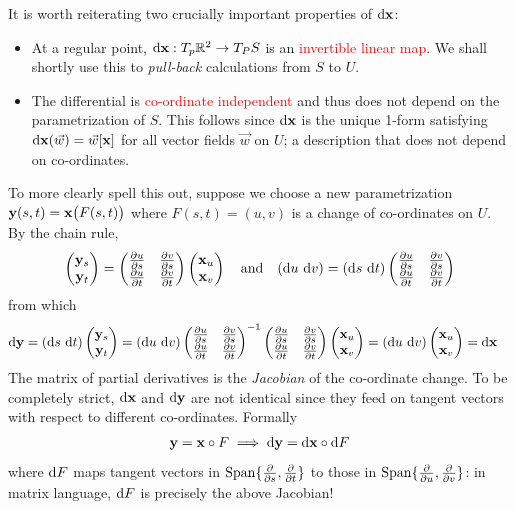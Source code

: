 It is worth reiterating two crucially important properties of $\dvx$:
\begin{itemize}
  \item At a regular point, $\dvx:T_p\R^2\to T_PS$ is an \textcolor{red}{invertible linear map}. We shall shortly use this to \emph{pull-back} calculations from $S$ to $U$.
  \item The differential is \textcolor{red}{co-ordinate independent} and thus does not depend on the parametrization of $S$. This follows since $\dvx$ is the unique 1-form satisfying $\dvx(\vec w)=\vec w[\vx]$ for all vector fields $\vec w$ on $U$; a description that does not depend on co-ordinates.
\end{itemize}


\begin{aside}\label{aside:coc}
	\quad To more clearly spell this out, suppose we choose a new parametrization $\vy(s,t)=\vx\bigl(F(s,t)\bigr)$ where $F(s,t)=(u,v)$ is a change of co-ordinates on $U$. By the chain rule,
	\[
		\twovec{\vy_s}{\vy_t}=
		\begin{pmatrix}
			\partials[u]{s}&\partials[v]{s}\\
			\partials[u]{t}&\partials[v]{t}
		\end{pmatrix}
		\twovec{\vx_u}{\vx_v} \quad\text{and}\quad
		(\du\ \dv)=(\ds\ \dt)
		\begin{pmatrix}
			\partials[u]{s}&\partials[v]{s}\\
			\partials[u]{t}&\partials[v]{t}
		\end{pmatrix}
	\]
	from which
	\begin{align*}
		\D\vy&=(\ds\ \dt)\twovec{\vy_s}{\vy_t} =(\du\ \dv)
		\begin{pmatrix}
			\partials[u]{s}&\partials[v]{s}\\
			\partials[u]{t}&\partials[v]{t}
		\end{pmatrix}^{-1}
		\begin{pmatrix}
			\partials[u]{s}&\partials[v]{s}\\
			\partials[u]{t}&\partials[v]{t}
		\end{pmatrix}
		\twovec{\vx_u}{\vx_v} =(\du\ \dv)\twovec{\vx_u}{\vx_v}=\dvx
	\end{align*}
	The matrix of partial derivatives is the \emph{Jacobian} of the co-ordinate change.
	\smallbreak
	To be completely strict, $\dvx$ and $\D\vy$ are not identical since they feed on tangent vectors with respect to different co-ordinates. Formally
	\[
		\vy=\vx\circ F\implies\D\vy=\dvx\circ\D F
	\]
	where $\D F$ maps tangent vectors in $\Span\{\partials s,\partials t\}$ to those in $\Span\{\partials u,\partials v\}$: in matrix language, $\D F$ is precisely the above Jacobian!
\end{aside}


